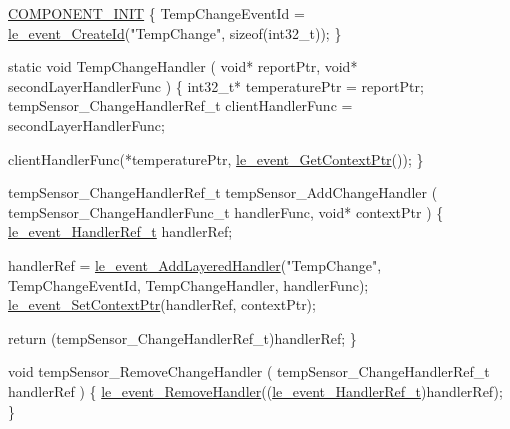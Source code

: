 \begin{DoxyCode}
\hyperlink{le__event_loop_8h_abdb9187a56836a93d19cc793cbd4b7ec}{COMPONENT\_INIT}
\{
    TempChangeEventId = \hyperlink{le__event_loop_8h_a41a96eb3affb07184b519164cf54e213}{le\_event\_CreateId}(\textcolor{stringliteral}{"TempChange"}, \textcolor{keyword}{sizeof}(int32\_t));
\}

\textcolor{keyword}{static} \textcolor{keywordtype}{void} TempChangeHandler
(
    \textcolor{keywordtype}{void}* reportPtr,
    \textcolor{keywordtype}{void}* secondLayerHandlerFunc
)
\{
    int32\_t* temperaturePtr = reportPtr;
    tempSensor\_ChangeHandlerRef\_t clientHandlerFunc = secondLayerHandlerFunc;

    clientHandlerFunc(*temperaturePtr, \hyperlink{le__event_loop_8h_a1c73916295cc9e17af07e02756aa86c9}{le\_event\_GetContextPtr}());
\}

tempSensor\_ChangeHandlerRef\_t tempSensor\_AddChangeHandler
(
    tempSensor\_ChangeHandlerFunc\_t  handlerFunc,
    \textcolor{keywordtype}{void}*                           contextPtr
)
\{
    \hyperlink{le__event_loop_8h_ae7ab96b8e3441b3d484fcf52aa7a9dad}{le\_event\_HandlerRef\_t} handlerRef;

    handlerRef = \hyperlink{le__event_loop_8h_a8b906d38935f64953482f42c745e1c18}{le\_event\_AddLayeredHandler}(\textcolor{stringliteral}{"TempChange"},
                                            TempChangeEventId,
                                            TempChangeHandler,
                                            handlerFunc);
    \hyperlink{le__event_loop_8h_ae0c4307a9715794c720e525032aa0bfd}{le\_event\_SetContextPtr}(handlerRef, contextPtr);

    \textcolor{keywordflow}{return} (tempSensor\_ChangeHandlerRef\_t)handlerRef;
\}

\textcolor{keywordtype}{void} tempSensor\_RemoveChangeHandler
(
    tempSensor\_ChangeHandlerRef\_t    handlerRef
)
\{
    \hyperlink{le__event_loop_8h_ae31a85d4acbef72451b5411a613eea58}{le\_event\_RemoveHandler}((\hyperlink{le__event_loop_8h_ae7ab96b8e3441b3d484fcf52aa7a9dad}{le\_event\_HandlerRef\_t})handlerRef);
\}
\end{DoxyCode}


